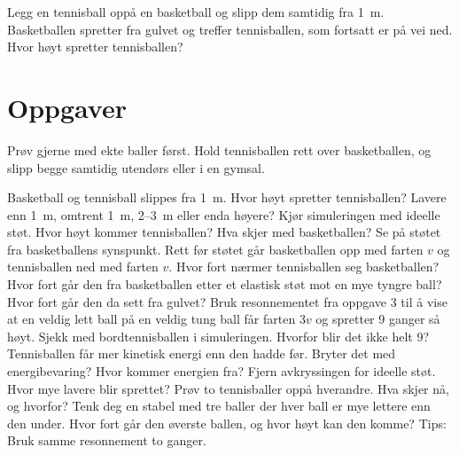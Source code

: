 \documentclass[11pt]{article}
\begin{document}

Legg en tennisball oppå en basketball og slipp dem samtidig fra 1~m. Basketballen spretter fra gulvet og treffer tennisballen, som fortsatt er på vei ned. Hvor høyt spretter tennisballen?

\section*{Oppgaver}

Prøv gjerne med ekte baller først. Hold tennisballen rett over basketballen, og slipp begge samtidig utendørs eller i en gymsal.

\begin{oppgaveliste}
\oppgave {}Basketball og tennisball slippes fra 1~m. Hvor høyt spretter tennisballen? Lavere enn 1~m, omtrent 1~m, 2–3~m eller enda høyere?
\svar
\oppgave {}Kjør simuleringen med ideelle støt. Hvor høyt kommer tennisballen? Hva skjer med basketballen?
\svar
\oppgave {}Se på støtet fra basketballens synspunkt. Rett før støtet går basketballen opp med farten $v$ og tennisballen ned med farten $v$. Hvor fort nærmer tennisballen seg basketballen? Hvor fort går den fra basketballen etter et elastisk støt mot en mye tyngre ball? Hvor fort går den da sett fra gulvet?
\svar
\oppgave {}Bruk resonnementet fra oppgave 3 til å vise at en veldig lett ball på en veldig tung ball får farten $3v$ og spretter 9 ganger så høyt. Sjekk med bordtennisballen i simuleringen. Hvorfor blir det ikke helt 9?
\svar
\oppgave {}Tennisballen får mer kinetisk energi enn den hadde før. Bryter det med energibevaring? Hvor kommer energien fra?
\svar
\oppgave {}Fjern avkryssingen for ideelle støt. Hvor mye lavere blir sprettet? Prøv to tennisballer oppå hverandre. Hva skjer nå, og hvorfor?
\svar
\oppgave {}Tenk deg en stabel med tre baller der hver ball er mye lettere enn den under. Hvor fort går den øverste ballen, og hvor høyt kan den komme? Tips: Bruk samme resonnement to ganger.
\svar
\end{oppgaveliste}
\end{document}
